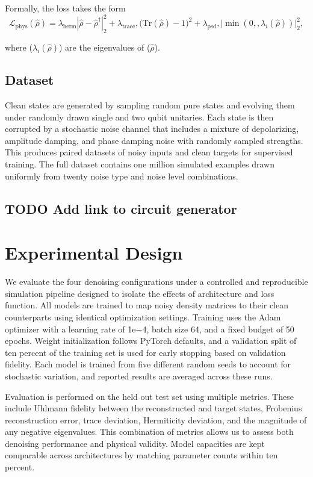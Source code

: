 \documentclass[11pt]{article}
\begin{document}
Formally, the loss takes the form
$$
\mathcal{L}_{\mathrm{phys}}(\hat{\rho})
= \lambda_{\mathrm{herm}} \left|\hat{\rho} - \hat{\rho}^\dagger\right|_2^2 +
\lambda_{\mathrm{trace}},\big(\mathrm{Tr}(\hat{\rho}) - 1\big)^2 +
\lambda_{\mathrm{psd}},\big| \min(0,, \lambda_i(\hat{\rho})) \big|_2^2 ,
$$

where (\(\lambda_i(\hat{\rho})\)) are the eigenvalues of (\(\hat{\rho}\)).
\subsection{Dataset}
\label{sec:org391ac34}
Clean states are generated by sampling random pure states and evolving them under randomly drawn single and two qubit unitaries. Each state is then corrupted by a stochastic noise channel that includes a mixture of depolarizing, amplitude damping, and phase damping noise with randomly sampled strengths. This produces paired datasets of noisy inputs and clean targets for supervised training. The full dataset contains one million simulated examples drawn uniformly from twenty noise type and noise level combinations. 
\subsection{{\bfseries\sffamily TODO} Add link to circuit generator}
\label{sec:org59c7aa2}
\section{Experimental Design}
\label{sec:orgdd6070b}
We evaluate the four denoising configurations under a controlled and reproducible simulation pipeline designed to isolate the effects of architecture and loss function. All models are trained to map noisy density matrices to their clean counterparts using identical optimization settings. Training uses the Adam optimizer with a learning rate of 1e−4, batch size 64, and a fixed budget of 50 epochs. Weight initialization follows PyTorch defaults, and a validation split of ten percent of the training set is used for early stopping based on validation fidelity. Each model is trained from five different random seeds to account for stochastic variation, and reported results are averaged across these runs.

Evaluation is performed on the held out test set using multiple metrics. These include Uhlmann fidelity between the reconstructed and target states, Frobenius reconstruction error, trace deviation, Hermiticity deviation, and the magnitude of any negative eigenvalues. This combination of metrics allows us to assess both denoising performance and physical validity. Model capacities are kept comparable across architectures by matching parameter counts within ten percent.
\end{document}
